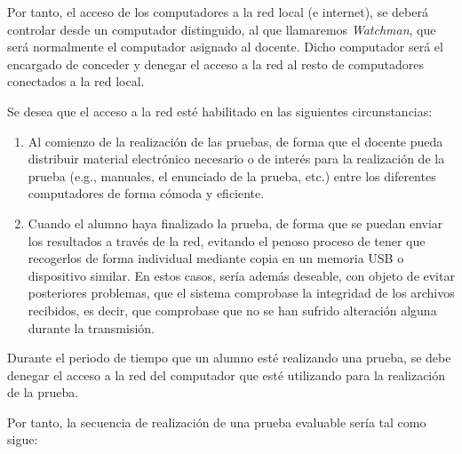 
Por tanto, el acceso de los computadores a la red local (e internet), se deberá controlar desde un computador distinguido, al que llamaremos \emph{Watchman},
que será normalmente el computador asignado al docente. Dicho computador será el encargado de conceder y denegar el acceso a la red al resto de computadores conectados a la red local.
\newline

Se desea que el acceso a la red esté habilitado en las siguientes circunstancias:
\begin{enumerate}
	\item Al comienzo de la realización de las pruebas, de forma que el docente pueda distribuir material electrónico necesario o de interés para la realización de la prueba (e.g., manuales, el enunciado de la prueba, etc.) entre los diferentes computadores de forma cómoda y eficiente.
	\item Cuando el alumno haya finalizado la prueba, de forma que se puedan enviar los resultados a través de la red, evitando el penoso proceso de tener que recogerlos de forma individual mediante copia en un memoria USB o dispositivo similar. En estos casos, sería además deseable, con objeto de evitar posteriores problemas, que el sistema comprobase la integridad de los archivos recibidos, es decir, que comprobase que no se han sufrido alteración alguna durante la transmisión.
\end{enumerate}

Durante el periodo de tiempo que un alumno esté realizando una prueba, se debe denegar el acceso a la red del computador que esté utilizando para la realización de la prueba.
\newline


Por tanto, la secuencia de realización de una prueba evaluable sería tal como sigue:

